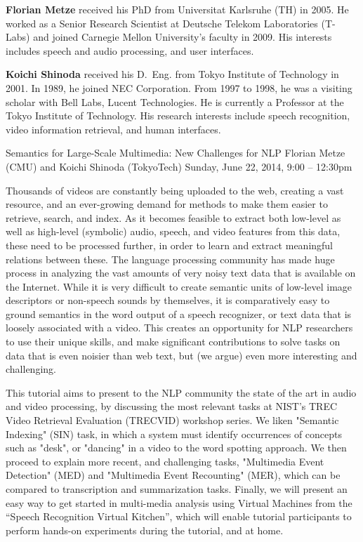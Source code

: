 \begin{bio}
{\bfseries Florian Metze} received his PhD from Universitat Karlsruhe (TH) in 2005. He worked as a Senior Research Scientist at Deutsche Telekom Laboratories (T-Labs) and joined Carnegie Mellon University's faculty in 2009. His interests includes speech and audio processing, and user interfaces.

{\bfseries Koichi Shinoda} received his D.\ Eng. from Tokyo Institute of Technology in 2001. In 1989, he joined NEC Corporation. From 1997 to 1998, he was a visiting scholar with Bell Labs, Lucent Technologies. He is currently a Professor at the Tokyo Institute of Technology. His research interests include speech recognition, video information retrieval, and human interfaces.
\end{bio}

\begin{tutorial}{Semantics for Large-Scale Multimedia: New Challenges for NLP}
  {Florian Metze (CMU) and Koichi Shinoda (TokyoTech)}
  {Sunday, June 22, 2014, 9:00 -- 12:30pm}
  {\TutLocC}

Thousands of videos are constantly being uploaded to the web, creating
a vast resource, and an ever-growing demand for methods to make them
easier to retrieve, search, and index. As it becomes feasible to
extract both low-level as well as high-level (symbolic) audio, speech,
and video features from this data, these need to be processed further,
in order to learn and extract meaningful relations between these. The
language processing community has made huge process in analyzing the
vast amounts of very noisy text data that is available on the
Internet. While it is very difficult to create semantic units of
low-level image descriptors or non-speech sounds by themselves, it is
comparatively easy to ground semantics in the word output of a speech
recognizer, or text data that is loosely associated with a video. This
creates an opportunity for NLP researchers to use their unique skills,
and make significant contributions to solve tasks on data that is even
noisier than web text, but (we argue) even more interesting and
challenging.

This tutorial aims to present to the NLP community the state of the
art in audio and video processing, by discussing the most relevant
tasks at NIST's TREC Video Retrieval Evaluation (TRECVID) workshop
series. We liken "Semantic Indexing" (SIN) task, in which a system
must identify occurrences of concepts such as "desk", or "dancing" in
a video to the word spotting approach. We then proceed to explain more
recent, and challenging tasks, "Multimedia Event Detection" (MED) and
"Multimedia Event Recounting" (MER), which can be compared to
transcription and summarization tasks. Finally, we will present an
easy way to get started in multi-media analysis using Virtual Machines
from the ``Speech Recognition Virtual Kitchen'', which will enable
tutorial participants to perform hands-on experiments during the
tutorial, and at home.

\end{tutorial}
